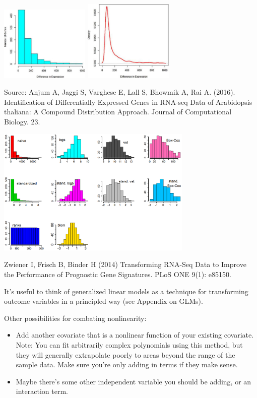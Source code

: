 \begin{center}
\includegraphics[width=0.32\textwidth]{img/gene-expression-histogram.jpg}
\includegraphics[width=0.32\textwidth]{img/gene-expression-density.jpg}
\end{center}
{\small Source: Anjum A, Jaggi S, Varghese E, Lall S, Bhowmik A, Rai A. (2016). Identification of Differentially Expressed Genes in RNA-seq Data of Arabidopsis thaliana: A Compound Distribution Approach. Journal of Computational Biology. 23.}

\begin{center}
\includegraphics[width=0.7\textwidth]{img/gene-expression-transforms.png}
\end{center}
{\small Zwiener I, Frisch B, Binder H (2014) Transforming RNA-Seq Data to Improve the Performance of Prognostic Gene Signatures. PLoS ONE 9(1): e85150.}

It's useful to think of generalized linear models as a technique for transforming outcome variables in a principled way (see Appendix on GLMs).

Other possibilities for combating nonlinearity: 
\begin{itemize}
\item Add another covariate that is a nonlinear function of your existing covariate. Note: You can fit arbitrarily complex polynomials using this method, but they will generally extrapolate poorly to areas beyond the range of the sample data. Make sure you're only adding in terms if they make sense.
\item Maybe there's some other independent variable you should be adding, or an interaction term.
\end{itemize}

